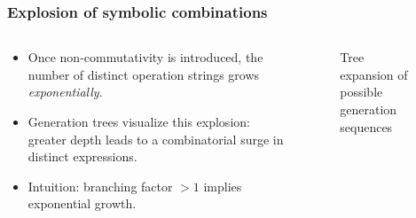 \documentclass[aspectratio=169]{beamer}
\begin{document}
\begin{frame}
    \frametitle{Explosion of symbolic combinations}
    \begin{columns}
        \begin{column}{0.55\textwidth}
            \begin{itemize}
                \item Once non-commutativity is introduced, the number of distinct operation strings grows \emph{exponentially}.
                \item Generation trees visualize this explosion: greater depth leads to a combinatorial surge in distinct expressions.
                \item Intuition: branching factor $>1$ implies exponential growth.
            \end{itemize}
        \end{column}
        \begin{column}{0.45\textwidth}
            \begin{figure}[ht]\centering
                \caption{Tree expansion of possible generation sequences}
            \end{figure}
        \end{column}
    \end{columns}
\end{frame}
\end{document}
